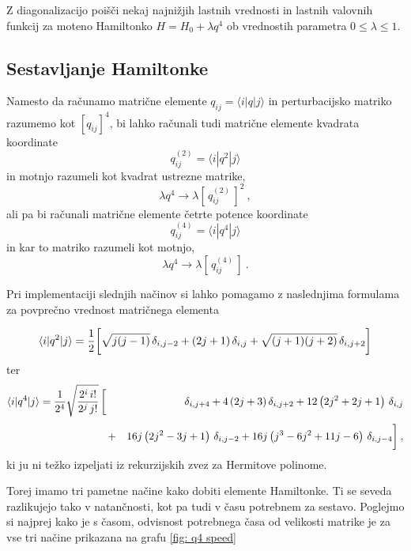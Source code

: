\documentclass[slovene,11pt,a4paper]{article}
\begin{document}
Z diagonalizacijo poišči nekaj najnižjih lastnih
vrednosti in lastnih valovnih funkcij za moteno Hamiltonko
$H = H_0 + \lambda q^4$
ob vrednostih parametra $0\le\lambda\le 1$.

\subsection{Sestavljanje Hamiltonke}

Namesto da računamo matrične elemente
$q_{ij}=\langle i | q | j \rangle$ in perturbacijsko matriko
razumemo kot $[ q_{ij} ]^4$, bi lahko računali tudi matrične
elemente kvadrata koordinate
\begin{equation*}
q^{(2)}_{ij} = \langle i | q^2 | j \rangle
\end{equation*}
in motnjo razumeli kot kvadrat ustrezne matrike,
\begin{equation*}
\lambda q^4 \to \lambda \left[ \, q^{(2)}_{ij} \,\right]^2 \>,
\end{equation*}
ali pa bi računali matrične elemente četrte potence koordinate
\begin{equation*}
q^{(4)}_{ij} = \langle i | q^4 | j \rangle
\end{equation*}
in kar to matriko razumeli kot motnjo,
\begin{equation*}
\lambda q^4 \to \lambda \left[ \, q^{(4)}_{ij} \,\right] \>.
\end{equation*}

Pri implementaciji slednjih načinov si lahko pomagamo z naslednjima formulama za povprečno vrednost matričnega elementa

\begin{equation*}
\langle i|q^2|j\rangle
  = {1\over 2} \biggl[
    {\sqrt{j(j-1)}} \, \delta_{i,j-2}
  + {(2j+1)} \, \delta_{i,j}
  + {\sqrt{(j+1)(j+2)}} \, \delta_{i,j+2} \biggr]
\end{equation*}
ter
\begin{eqnarray*}
\langle i|q^4|j\rangle
  = {1\over 2^4}\sqrt{2^i \, i!\over 2^{j} \, j! } \, \biggl[ \,
  &\,& \delta_{i,j+4} + 4\left(2j+3\right) \delta_{i,j+2}
                      + 12 \left(2j^2+2j+1\right) \, \delta_{i,j} \\[3pt]
  &+& 16j \left(2j^2-3j+1\right) \, \delta_{i,j-2}
     + 16j\left(j^3-6j^2+11j-6\right) \, \delta_{i,j-4} \biggr] \>,
\end{eqnarray*}
ki ju ni težko izpeljati iz rekurzijskih zvez za Hermitove
polinome.

\bigskip

Torej imamo tri pametne načine kako dobiti elemente Hamiltonke. Ti se seveda razlikujejo tako v natančnosti, kot pa tudi v času potrebnem za sestavo. Poglejmo si najprej kako je s časom, odvisnost potrebnega časa od velikosti matrike je za vse tri načine prikazana na grafu \ref{fig: q4 speed}
\end{document}
